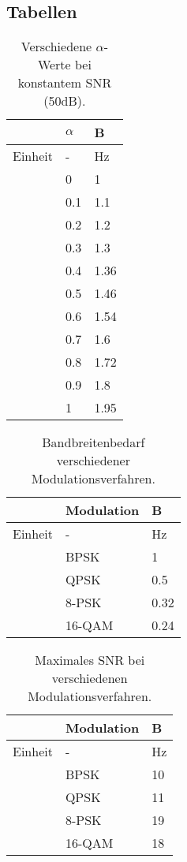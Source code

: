 \documentclass[12pt,a4paper,ngerman]{article}
\begin{document}
\pagebreak
	
\pagebreak
\clearpage
\subsection{Tabellen}
\begin{center}
\begin{table}[h!]
\centering

\begin{tabular}{ |l|l|l| }
  \hline
  & $\alpha$ & B \\
  \hline
  Einheit & - & Hz \\ \hline
  & 0 & 1 \\ \hline
  & 0.1 & 1.1 \\ \hline
  & 0.2 & 1.2 \\ \hline
  & 0.3 & 1.3 \\ \hline
  & 0.4 & 1.36 \\ \hline
  & 0.5 & 1.46 \\ \hline
  & 0.6 & 1.54 \\ \hline
  & 0.7 & 1.6 \\ \hline
  & 0.8 & 1.72 \\ \hline
  & 0.9 & 1.8 \\ \hline
  & 1 & 1.95 \\
  \hline
\end{tabular}
\caption{Verschiedene $\alpha$-Werte bei konstantem SNR (50dB).\label{tab:TABcossweep}}
\end{table}
\end{center}
\begin{table}[h!]
\centering
\begin{tabular}{ |l|l|l| }
  \hline
  & Modulation & B \\
  \hline
  Einheit & - & Hz \\ \hline
  & BPSK & 1 \\ \hline
  & QPSK & 0.5 \\ \hline
  & 8-PSK & 0.32 \\ \hline
  & 16-QAM & 0.24 \\ \hline
  \hline
\end{tabular}
\caption{Bandbreitenbedarf verschiedener Modulationsverfahren.\label{tab:TABmodverf}}
\end{table}

\begin{table}[h!]
\centering
\begin{tabular}{ |l|l|l| }
  \hline
  & Modulation & B \\
  \hline
  Einheit & - & Hz \\
  \hline
  & BPSK & 10 \\ \hline
  & QPSK & 11 \\ \hline
  & 8-PSK & 19 \\ \hline
  & 16-QAM & 18 \\ 
  \hline
\end{tabular}
\caption{Maximales SNR bei verschiedenen Modulationsverfahren.\label{tab:TABmaxsnr}}
\end{table}
\end{document}
